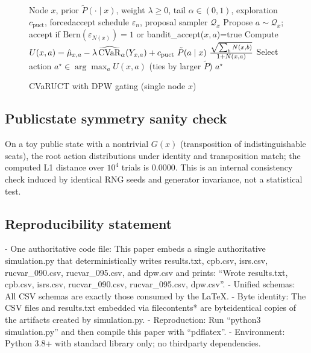 \begin{figure}[t]
\centering
\begin{adjustbox}{width=\linewidth}
\begin{minipage}{\linewidth}
\begin{algorithm}[H]
\caption{CVaR\textendash UCT with DPW gating (single node $x$)}
\label{alg:cvar-uct-dpw}
\begin{algorithmic}[1]
\Require Node $x$, prior $\tilde P(\cdot\mid x)$, weight $\lambda\ge 0$, tail $\alpha\in(0,1)$, exploration $c_{\text{puct}}$, forced\textendash accept schedule $\varepsilon_n$, proposal sampler $\mathcal{Q}_x$
  \State Propose $a\sim \mathcal{Q}_x$; accept if $\mathrm{Bern}(\varepsilon_{N(x)})=1$ or bandit\_accept($x,a$)=true
\EndIf
{}
  \State Compute $U(x,a)=\hat\mu_{x,a}-\lambda\,\widehat{\mathrm{CVaR}}_\alpha(Y_{x,a}) + c_{\text{puct}}\ \tilde P(a\mid x)\ \frac{\sqrt{\sum_b N(x,b)}}{1+N(x,a)}$
\EndFor
\State Select action $a^\star\in\arg\max_a U(x,a)$ (ties by larger $\tilde P$)
\State \Return $a^\star$
\end{algorithmic}
\end{algorithm}
\end{minipage}
\end{adjustbox}
\end{figure}

\subsection{Public\textendash state symmetry sanity check}
On a toy public state with a nontrivial $G(x)$ (transposition of indistinguishable seats), the root action distributions under identity and transposition match; the computed L1 distance over $10^4$ trials is 0.0000. This is an internal consistency check induced by identical RNG seeds and generator invariance, not a statistical test.

\subsection*{Reproducibility statement}
- One authoritative code file: This paper embeds a single authoritative simulation.py that deterministically writes results.txt, cpb.csv, isrs.csv, rucvar\_090.csv, rucvar\_095.csv, and dpw.csv and prints: “Wrote results.txt, cpb.csv, isrs.csv, rucvar\_090.csv, rucvar\_095.csv, dpw.csv”.
- Unified schemas: All CSV schemas are exactly those consumed by the LaTeX.
- Byte identity: The CSV files and results.txt embedded via filecontents* are byte\textendash identical copies of the artifacts created by simulation.py.
- Reproduction: Run “python3 simulation.py” and then compile this paper with “pdflatex”.
- Environment: Python 3.8+ with standard library only; no third\textendash party dependencies.

